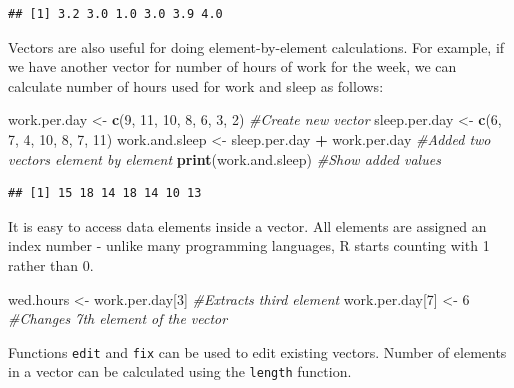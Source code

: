 \documentclass[]{krantz}
\makeatletter
\newenvironment{Shaded}{\begin{snugshade}}{\end{snugshade}}
\newcommand{\KeywordTok}[1]{\textcolor[rgb]{0.27,0.27,0.27}{\textbf{#1}}}
\newcommand{\DecValTok}[1]{\textcolor[rgb]{0.06,0.06,0.06}{#1}}
\newcommand{\StringTok}[1]{\textcolor[rgb]{0.5,0.5,0.5}{#1}}
\newcommand{\CommentTok}[1]{\textcolor[rgb]{0.37,0.37,0.37}{\textit{#1}}}
\newcommand{\OperatorTok}[1]{\textcolor[rgb]{0.43,0.43,0.43}{\textbf{#1}}}
\newcommand{\NormalTok}[1]{#1}
\newenvironment{kframe}{%
\medskip{}
\setlength{\fboxsep}{.8em}
 \def\at@end@of@kframe{}%
 \ifinner\ifhmode%
  \def\at@end@of@kframe{\end{minipage}}%
  \begin{minipage}{\columnwidth}%
 \fi\fi%
 \def\FrameCommand##1{\hskip\@totalleftmargin \hskip-\fboxsep
 \colorbox{shadecolor}{##1}\hskip-\fboxsep
     \hskip-\linewidth \hskip-\@totalleftmargin \hskip\columnwidth}%
 \MakeFramed {\advance\hsize-\width
   \@totalleftmargin\z@ \linewidth\hsize
   \@setminipage}}%
 {\par\unskip\endMakeFramed%
 \at@end@of@kframe}
\renewenvironment{Shaded}{\begin{kframe}}{\end{kframe}}
\makeatother
\begin{document}
\begin{verbatim}
## [1] 3.2 3.0 1.0 3.0 3.9 4.0
\end{verbatim}

Vectors are also useful for doing element-by-element calculations. For
example, if we have another vector for number of hours of work for the
week, we can calculate number of hours used for work and sleep as
follows:

\begin{Shaded}
\begin{Highlighting}[]
\NormalTok{work.per.day <-}\StringTok{ }\KeywordTok{c}\NormalTok{(}\DecValTok{9}\NormalTok{, }\DecValTok{11}\NormalTok{, }\DecValTok{10}\NormalTok{, }\DecValTok{8}\NormalTok{, }\DecValTok{6}\NormalTok{, }\DecValTok{3}\NormalTok{, }\DecValTok{2}\NormalTok{) }\CommentTok{#Create new vector}
\NormalTok{sleep.per.day <-}\StringTok{ }\KeywordTok{c}\NormalTok{(}\DecValTok{6}\NormalTok{, }\DecValTok{7}\NormalTok{, }\DecValTok{4}\NormalTok{, }\DecValTok{10}\NormalTok{, }\DecValTok{8}\NormalTok{, }\DecValTok{7}\NormalTok{, }\DecValTok{11}\NormalTok{)}
\NormalTok{work.and.sleep <-}\StringTok{ }\NormalTok{sleep.per.day }\OperatorTok{+}\StringTok{ }\NormalTok{work.per.day }
\CommentTok{#Added two vectors element by element}
\KeywordTok{print}\NormalTok{(work.and.sleep) }\CommentTok{#Show added values}
\end{Highlighting}
\end{Shaded}

\begin{verbatim}
## [1] 15 18 14 18 14 10 13
\end{verbatim}

It is easy to access data elements inside a vector. All elements are
assigned an index number - unlike many programming languages, R starts
counting with 1 rather than 0.

\begin{Shaded}
\begin{Highlighting}[]
\NormalTok{wed.hours <-}\StringTok{ }\NormalTok{work.per.day[}\DecValTok{3}\NormalTok{] }\CommentTok{#Extracts third element}
\NormalTok{work.per.day[}\DecValTok{7}\NormalTok{] <-}\StringTok{ }\DecValTok{6} \CommentTok{#Changes 7th element of the vector}
\end{Highlighting}
\end{Shaded}

Functions \texttt{edit} and \texttt{fix} can be used to edit existing
vectors. Number of elements in a vector can be calculated using the
\texttt{length} function.
\end{document}

